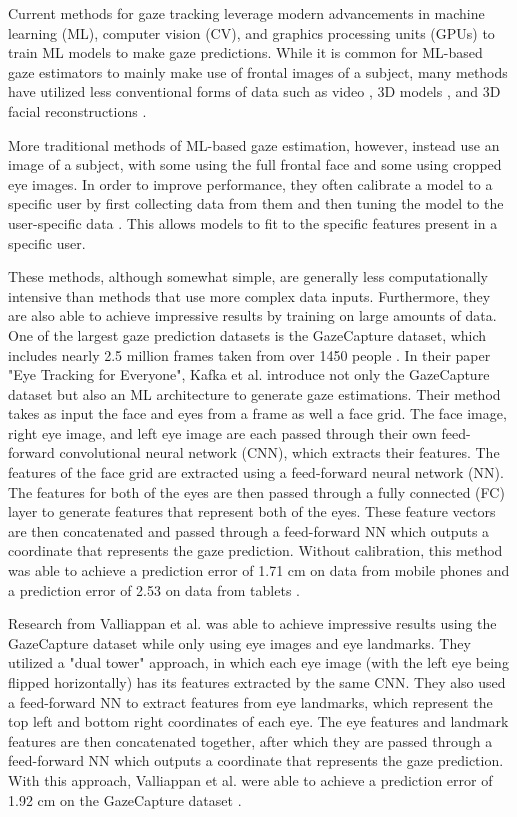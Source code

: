 \documentclass{article}
\begin{document}
Current methods for gaze tracking leverage modern advancements in machine learning (ML), computer vision (CV), and graphics processing units (GPUs) to train ML models to make gaze predictions. While it is common for ML-based gaze estimators to mainly make use of frontal images of a subject, many methods have utilized less conventional forms of data such as video \cite{videogaze}, 3D models \cite{3dmodelgaze}, and 3D facial reconstructions \cite{3dfacereconstruction}.

More traditional methods of ML-based gaze estimation, however, instead use an image of a subject, with some using the full frontal face and some using cropped eye images. In order to improve performance, they often calibrate a model to a specific user by first collecting data from them and then tuning the model to the user-specific data \cite{mitpaper, googlepaper}. This allows models to fit to the specific features present in a specific user.

These methods, although somewhat simple, are generally less computationally intensive than methods that use more complex data inputs. Furthermore, they are also able to achieve impressive results by training on large amounts of data. One of the largest gaze prediction datasets is the GazeCapture dataset, which includes nearly 2.5 million frames taken from over 1450 people \cite{mitpaper}. In their paper "Eye Tracking for Everyone", Kafka et al. introduce not only the GazeCapture dataset but also an ML architecture to generate gaze estimations. Their method takes as input the face and eyes from a frame as well a face grid. The face image, right eye image, and left eye image are each passed through their own feed-forward convolutional neural network (CNN), which extracts their features. The features of the face grid are extracted using a feed-forward neural network (NN). The features for both of the eyes are then passed through a fully connected (FC) layer to generate features that represent both of the eyes. These feature vectors are then concatenated and passed through a feed-forward NN which outputs a  coordinate that represents the gaze prediction. Without calibration, this method was able to achieve a prediction error of 1.71 cm on data from mobile phones and a prediction error of 2.53 on data from tablets \cite{mitpaper}.

Research from Valliappan et al. was able to achieve impressive results using the GazeCapture dataset while only using eye images and eye landmarks. They utilized a "dual tower" approach, in which each eye image (with the left eye being flipped horizontally) has its features extracted by the same CNN. They also used a feed-forward NN to extract features from eye landmarks, which represent the top left and bottom right coordinates of each eye. The eye features and landmark features are then concatenated together, after which they are passed through a feed-forward NN which outputs a  coordinate that represents the gaze prediction. With this approach, Valliappan et al. were able to achieve a prediction error of 1.92 cm on the GazeCapture dataset \cite{googlepaper}.
\end{document}
